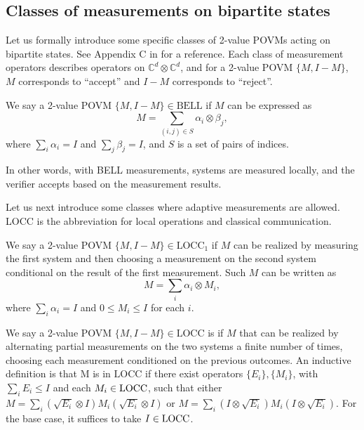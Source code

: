 \subsection{Classes of measurements on bipartite states}\label{sec:measurement}

Let us formally introduce some specific classes of 2-value POVMs acting on bipartite states. See Appendix C in \cite{HM13} for a reference. Each class of measurement operators describes operators on $\mathbb{C}^d \otimes \mathbb{C}^d$, and for a 2-value POVM $\{M, I-M\}$, $M$ corresponds to ``accept'' and $I-M$ corresponds to ``reject''.

\begin{definition}
    We say a 2-value POVM $\{M, I-M\} \in \mathrm{BELL}$ if $M$ can be expressed as 
    \[
        M = \sum_{(i,j)\in S} \alpha_i \otimes \beta_j,
    \]
    where $\sum_i \alpha_i = I$ and $\sum_j \beta_j = I$, and $S$ is a set of pairs of indices.
\end{definition}

In other words, with BELL measurements, systems are measured locally, and the verifier accepts based on the measurement results.

Let us next introduce some classes where adaptive measurements are allowed. LOCC is the abbreviation for local operations and classical communication.
\begin{definition}
     We say a 2-value POVM $\{M, I-M\} \in \mathrm{LOCC}_1$ if $M$ can be realized by measuring the first system and then choosing a measurement on the second system conditional on the result of the first measurement.  Such $M$ can be written as
     \[
        M = \sum_i \alpha_i \otimes M_i,
     \]
    where $\sum_i \alpha_i = I$ and $0\leq M_i \leq I$ for each $i$.
\end{definition}

\begin{definition}
     We say a 2-value POVM $\{M, I-M\} \in \mathrm{LOCC}$ is if $M$ that can be realized by alternating partial measurements on the two systems a finite number of times, choosing each measurement conditioned on the previous outcomes. An inductive definition is that M is in $\mathrm{LOCC}$ if there exist operators $\{E_i\}, \{M_i\}$, with $\sum_i E_i\leq I$ and each $M_i\in{\rm LOCC}$, such that either $M = \sum_i (\sqrt{E_i}\otimes I)M_i(\sqrt{E_i}\otimes I)$ or $M = \sum_i (I\otimes \sqrt{E_i})M_i(I\otimes \sqrt{E_i})$.   For the base case, it suffices to take $I\in {\rm LOCC}$.
\end{definition}

